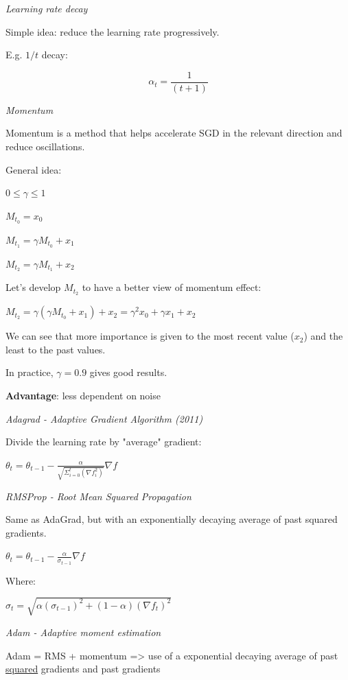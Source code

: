 \vspace{5mm}

\textit{Learning rate decay}

Simple idea: reduce the learning rate progressively.

E.g. $1/t$ decay:

$$\alpha_t=\frac{1}{(t+1)}$$

\vspace{5mm}
\textit{Momentum}

Momentum is a method that helps accelerate SGD in the relevant direction and reduce oscillations.

General idea:

$0 \le \gamma \le 1$

$M_{t_0}=x_0$

$M_{t_1}=\gamma M_{t_0} + x_1$

$M_{t_2}=\gamma M_{t_1} + x_2$

Let's develop $M_{t_2}$ to have a better view of momentum effect:

$M_{t_2} = \gamma (\gamma M_{t_0} + x_1) + x_2 = \gamma^2 x_0 + \gamma x_1 + x_2$

We can see that more importance is given to the most recent value ($x_2$) and the least to the past values.

\vspace{5mm}

In practice, $\gamma = 0.9$ gives good results.

\textbf{Advantage}: less dependent on noise

\vspace{5mm}
\textit{Adagrad - Adaptive Gradient Algorithm (2011)}

Divide the learning rate by "average" gradient:

$\theta_t = \theta_{t-1} - \frac{\alpha}{\sqrt{\Sigma_{i=0}^t(\nabla f_i^2)}}\nabla f$

\vspace{5mm}
\textit{RMSProp - Root Mean Squared Propagation}

Same as AdaGrad, but with an exponentially decaying average of past squared gradients.

$\theta_t = \theta_{t-1} - \frac{\alpha}{\sigma_{t-1}}\nabla f$

Where:

$\sigma_{t} = \sqrt{\alpha (\sigma_{t-1})^2+(1-\alpha)(\nabla f_t)^2}$


\vspace{5mm}
\textit{Adam - Adaptive moment estimation}

Adam = RMS + momentum => use of a exponential decaying average of past \underline{squared} gradients and past gradients

\vspace{5mm}